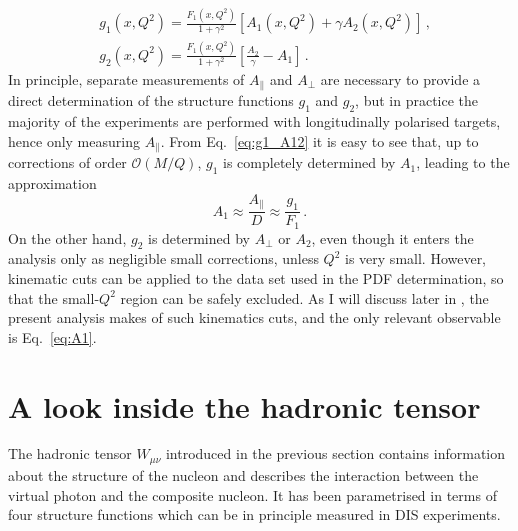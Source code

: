 \begin{align}
  & g_1(x,Q^2) = \frac{F_1 (x,Q^2)}{1 + \gamma^2} \left[ A_1(x,Q^2) + \gamma A_2 (x,Q^2) \right] \,,
  \label{eq:g1_A12}\\
  & g_2(x,Q^2) = \frac{F_1 (x,Q^2)}{1 + \gamma^2} \left[ \frac{A_2}{\gamma} - A_1 \right] \,.
\end{align}
In principle, separate measurements of $A_{\parallel}$ and $A_{\perp}$ are necessary to provide a direct determination of the structure functions $g_1$ and $g_2$, but in practice the majority of the experiments are performed with longitudinally polarised targets, hence only measuring $A_{\parallel}$. From Eq.~\eqref{eq:g1_A12} it is easy to see that, up to corrections of order $\mathcal{O}(M/Q)$, $g_1$ is completely determined by $A_1$, leading to the approximation
\begin{equation}
  A_1 \approx \frac{A_{\parallel}}{D} \approx \frac{g_1}{F_1} \,.
  \label{eq:A1}
\end{equation}
On the other hand, $g_2$ is determined by $A_{\perp}$ or $A_2$, even though it enters the analysis only as negligible small corrections, unless $Q^2$ is very small. However, kinematic cuts can be applied to the data set used in the PDF determination, so that the small-$Q^2$ region can be safely excluded. As I will discuss later in , the present analysis makes of such kinematics cuts, and the only relevant observable is Eq.~\eqref{eq:A1}.

\section{A look inside the hadronic tensor}

The hadronic tensor $W_{\mu \nu}$ introduced in the previous section contains information about the structure of the nucleon and describes the interaction between the virtual photon and the composite nucleon. It has been parametrised in terms of four structure functions which can be in principle measured in DIS experiments.%

